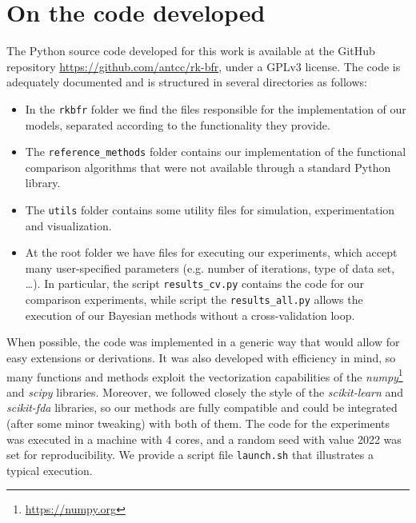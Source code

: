 %
%

\chapter{On the code developed}\label{ch:code}

The Python source code developed for this work is available at the GitHub repository \url{https://github.com/antcc/rk-bfr}, under a GPLv3 license. The code is adequately documented and is structured in several directories as follows:

\begin{itemize}
  \item In the \texttt{rkbfr} folder we find the files responsible for the implementation of our models, separated according to the functionality they provide.
  \item The \texttt{reference\_methods} folder contains our implementation of the functional comparison algorithms that were not available through a standard Python library.
  \item The \texttt{utils} folder contains some utility files for simulation, experimentation and visualization.
  \item At the root folder we have files for executing our experiments, which accept many user-specified parameters (e.g. number of iterations, type of data set, \ldots). In particular, the script \texttt{results\_cv.py} contains the code for our comparison experiments, while script the \texttt{results\_all.py} allows the execution of our Bayesian methods without a cross-validation loop.
\end{itemize}

When possible, the code was implemented in a generic way that would allow for easy extensions or derivations. It was also developed with efficiency in mind, so many functions and methods exploit the vectorization capabilities of the \textit{numpy}\footnote{\url{https://numpy.org}} and \textit{scipy} libraries. Moreover, we followed closely the style of the \textit{scikit-learn} and \textit{scikit-fda} libraries, so our methods are fully compatible and could be integrated (after some minor tweaking) with both of them. The code for the experiments was executed in a machine with 4 cores, and a random seed with value 2022 was set for reproducibility. We provide a script file \texttt{launch.sh} that illustrates a typical execution.

